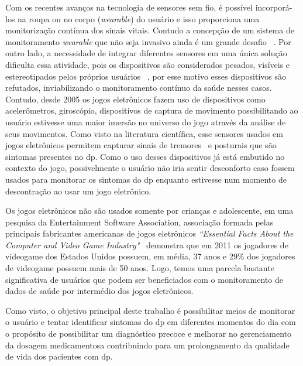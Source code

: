 Com os recentes avanços na tecnologia de sensores sem fio, é possível incorporá-los na roupa ou no corpo (\textit{wearable}) do usuário e isso proporciona uma monitorização contínua dos sinais vitais. Contudo a concepção de um sistema de monitoramento \textit{wearable} que não seja invasivo ainda é um grande desafio ~\cite{alemdar}. Por outro lado, a necessidade de integrar diferentes sensores em uma única solução dificulta essa atividade, pois os dispositivos são considerados pesados, visíveis e estereotipados pelos próprios usuários ~\cite{aarhus_negotiating_2010}, por esse motivo esses dispositivos são refutados, inviabilizando o monitoramento contínuo da saúde nesses casos. Contudo, desde 2005 os jogos eletrônicos fazem uso de dispositivos como acelerômetros, giroscópio, dispositivos de captura de movimento possibilitando ao usuário estivesse uma maior imersão no universo do jogo através da análise de seus movimentos. Como visto na literatura científica, esse sensores usados em jogos eletrônicos permitem capturar sinais de tremores~\cite{synnott_wiipd_2012,lemoyne2010} e posturais que são sintomas presentes no \ac{dp}. Como o uso desses dispositivos já está embutido no contexto do jogo, possivelmente o usuário não iria sentir desconforto caso fossem usados para monitorar os sintomas do \ac{dp} enquanto estivesse num momento de descontração ao usar um jogo eletrônico. 

Os jogos eletrônicos não são usados somente por crianças e adolescente, em uma pesquisa da Entertainment Software Association, associação formada pelas principais fabricantes americanas de jogos eletrônicos \textit{``Essential Facts About the Computer and Video Game Industry"}~\cite{esa2011} demonstra que em 2011 os jogadores de videogame dos Estados Unidos possuem, em média, 37 anos e 29$\%$ dos jogadores de videogame possuem mais de 50 anos. Logo, temos uma parcela bastante significativa de usuários que podem ser beneficiados com o monitoramento de dados de saúde por intermédio dos jogos eletrônicos.

Como visto, o objetivo principal deste trabalho é possibilitar meios de monitorar o usuário e tentar identificar sintomas do \ac{dp} em diferentes momentos do dia com o propósito de possibilitar um diagnóstico precoce e melhorar no gerenciamento da dosagem medicamentosa contribuindo para um prolongamento da qualidade de vida dos pacientes com \ac{dp}.

% 
